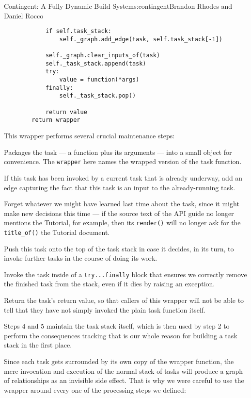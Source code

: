 \begin{aosachapter}{Contingent: A Fully Dynamic Build System}{s:contingent}{Brandon Rhodes and Daniel Rocco}
\begin{verbatim}
            if self.task_stack:
                self._graph.add_edge(task, self.task_stack[-1])

            self._graph.clear_inputs_of(task)
            self._task_stack.append(task)
            try:
                value = function(*args)
            finally:
                self._task_stack.pop()

            return value
        return wrapper
\end{verbatim}

This wrapper performs several crucial maintenance steps:

\begin{aosaenumerate}
\def\labelenumi{\arabic{enumi}.}
\item
  Packages the task --- a function plus its arguments --- into a small
  object for convenience. The \texttt{wrapper} here names the wrapped
  version of the task function.
\item
  If this task has been invoked by a current task that is already
  underway, add an edge capturing the fact that this task is an input to
  the already-running task.
\item
  Forget whatever we might have learned last time about the task, since
  it might make new decisions this time --- if the source text of the
  API guide no longer mentions the Tutorial, for example, then its
  \texttt{render()} will no longer ask for the \texttt{title\_of()} the
  Tutorial document.
\item
  Push this task onto the top of the task stack in case it decides, in
  its turn, to invoke further tasks in the course of doing its work.
\item
  Invoke the task inside of a \texttt{try...finally} block that ensures
  we correctly remove the finished task from the stack, even if it dies
  by raising an exception.
\item
  Return the task's return value, so that callers of this wrapper will
  not be able to tell that they have not simply invoked the plain task
  function itself.
\end{aosaenumerate}

Steps 4 and 5 maintain the task stack itself, which is then used by step
2 to perform the consequences tracking that is our whole reason for
building a task stack in the first place.

Since each task gets surrounded by its own copy of the wrapper function,
the mere invocation and execution of the normal stack of tasks will
produce a graph of relationships as an invisible side effect. That is
why we were careful to use the wrapper around every one of the
processing steps we defined:


\end{aosachapter}
